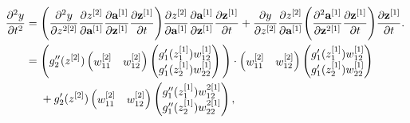 \documentclass{article}
\begin{document}
\begin{align}
\frac{\partial^2 y}{\partial t^2} &= \Bigg{(} \frac{\partial^2 y}{\partial z^{2{[2]}}} \frac{\partial z^{[2]}}{\partial \textbf{a}^{[1]}} \frac{\partial \textbf{a}^{[1]}}{\partial \textbf{z}^{[1]}} \frac{\partial \textbf{z}^{[1]}}{\partial t} \Bigg{)} \frac{\partial z^{[2]}}{\partial \textbf{a}^{[1]}} \frac{\partial \textbf{a}^{[1]}}{\partial \textbf{z}^{[1]}}  \frac{\partial \textbf{z}^{[1]}}{\partial t} + 
\frac{\partial y}{\partial z^{[2]}} \frac{\partial z^{[2]}}{\partial \textbf{a}^{[1]}} \Bigg{(} \frac{\partial^2 \textbf{a}^{[1]}}{\partial \textbf{z}^{2{[1]}}}  \frac{\partial \textbf{z}^{[1]}}{\partial t} \Bigg{)}  \frac{\partial \textbf{z}^{[1]}}{\partial t}. \\
&=\Bigg{(} g_2''(z^{[2]}) 
\begin{pmatrix}
w_{11}^{[2]} & w_{12}^{[2]} 
\end{pmatrix}
\begin{pmatrix}
g_1'(z_1^{[1]}) w_{12}^{[1]} \\
g_1'(z_2^{[1]}) w_{22}^{[1]}
\end{pmatrix}
\Bigg{)}\cdot 
\begin{pmatrix}
w_{11}^{[2]} & w_{12}^{[2]} 
\end{pmatrix}
\begin{pmatrix}
g_1'(z_1^{[1]}) w_{12}^{[1]} \\
g_1'(z_2^{[1]}) w_{22}^{[1]}
\end{pmatrix}
\\
&~~~~ +g_2'(z^{[2]})
\begin{pmatrix}
w_{11}^{[2]} & w_{12}^{[2]} 
\end{pmatrix}
\begin{pmatrix}
g_1''(z_1^{[1]}) w_{12}^{2{[1]}}  \\
g_1''(z_2^{[1]}) w_{22}^{2{[1]}} \\
\end{pmatrix},
\label{dy2dtlongmat} 
\end{align}
\end{document}
